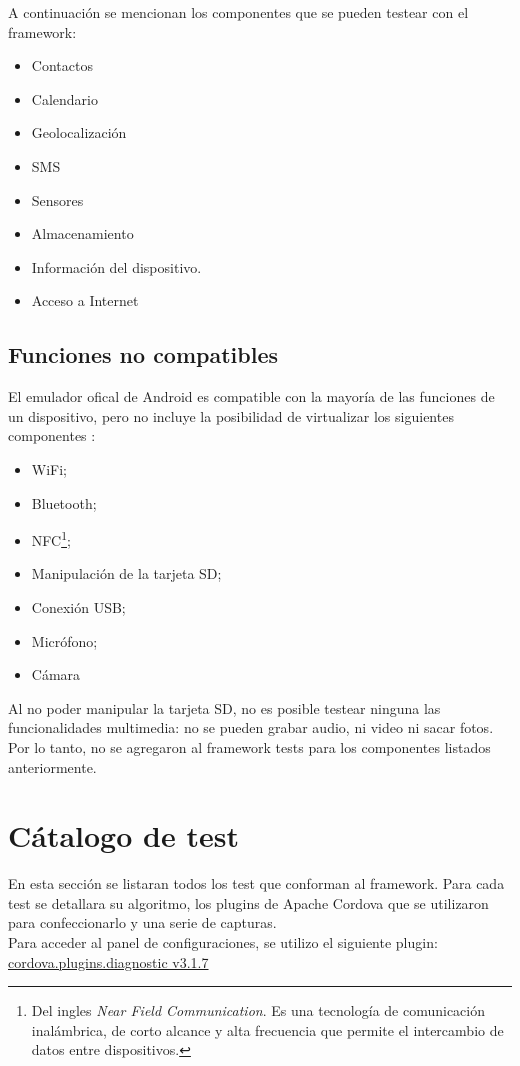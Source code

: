 A continuación se mencionan los componentes que se pueden testear con el framework:
\begin{itemize}
	\item Contactos
	\item Calendario
	\item Geolocalización
	\item SMS
	\item Sensores
	\item Almacenamiento
	\item Información del dispositivo.
	\item Acceso a Internet
\end{itemize}
\subsection{Funciones no compatibles}
El emulador ofical de Android es compatible con la mayoría de las funciones de un dispositivo, pero no incluye la posibilidad de virtualizar los siguientes componentes \cite{daemu}:
\begin{itemize}
    \item WiFi;
    \item Bluetooth;
    \item NFC\footnote{Del ingles \emph{Near Field Communication}. Es una tecnología de comunicación inalámbrica, de corto alcance y alta frecuencia que permite el intercambio de datos entre dispositivos.};
    \item Manipulación de la tarjeta SD;
    \item Conexión USB;
    \item Micrófono;
    \item Cámara
\end{itemize}
Al no poder manipular la tarjeta SD, no es posible testear ninguna las funcionalidades multimedia: no se pueden grabar audio, ni video ni sacar fotos.\\
Por lo tanto, no se agregaron al framework tests para los componentes listados anteriormente.
\section{C\'atalogo de test}
En esta sección se listaran todos los test que conforman al framework. Para cada test se detallara su algoritmo, los plugins de Apache Cordova que se utilizaron para confeccionarlo y una serie de capturas.\\
Para acceder al panel de configuraciones, se utilizo el siguiente plugin:\\ \href{https://www.npmjs.com/package/cordova.plugins.diagnostic}{cordova.plugins.diagnostic v3.1.7}
